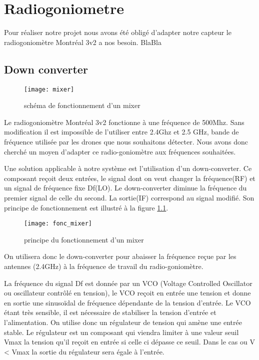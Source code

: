 
\chapter{Radiogoniometre}

Pour réaliser notre projet nous avons été obligé d'adapter notre capteur le radiogoniomètre Montréal 3v2 a nos besoin.
BlaBla

\section{Down converter}


\begin{wrapfigure}{r}{0.4\textwidth}
  
  \texttt{[image: mixer]}
  \caption{schéma de fonctionnement d'un mixer}
\end{wrapfigure}


Le radiogoniomètre Montréal 3v2 fonctionne à une fréquence de 500Mhz. Sans modification il est impossible de l’utiliser entre 2.4Ghz et 2.5 GHz, bande de fréquence utilisée par les drones que nous souhaitons détecter. Nous avons donc cherché un moyen d’adapter ce radio-goniomètre aux fréquences souhaitées.

Une solution applicable à notre système est l'utilisation d'un down-converter. Ce composant reçoit deux entrées, le signal dont on veut changer la fréquence(RF) et un signal de fréquence fixe Df(LO). Le down-converter diminue la fréquence du premier signal de celle du second. La sortie(IF) correspond au signal modifié. Son principe de fonctionnement est illustré à la figure \ref{fig:mix}.



\begin{figure}[h]
  \centering
  \texttt{[image: fonc\_mixer]}
  \caption{principe du fonctionnement d'un mixer}
  \label{fig:mix}
\end{figure}

On utilisera donc le down-converter pour abaisser la fréquence reçue par les antennes (2.4GHz) à la fréquence de travail du radio-goniomètre.

La fréquence du signal Df est donnée par un VCO (Voltage Controlled Oscillator ou oscillateur contrôlé en tension), le VCO reçoit en entrée une tension et donne en sortie une sinusoïdal de fréquence dépendante de la tension d’entrée. Le VCO étant très sensible, il est nécessaire de stabiliser la tension d’entrée et l’alimentation. On utilise donc un régulateur de tension qui amène une entrée stable. Le régulateur est un composant qui viendra limiter à une valeur seuil Vmax la tension qu'il reçoit en entrée si celle ci dépasse ce seuil. Dans le cas ou V < Vmax la sortie du régulateur sera égale à l'entrée.

